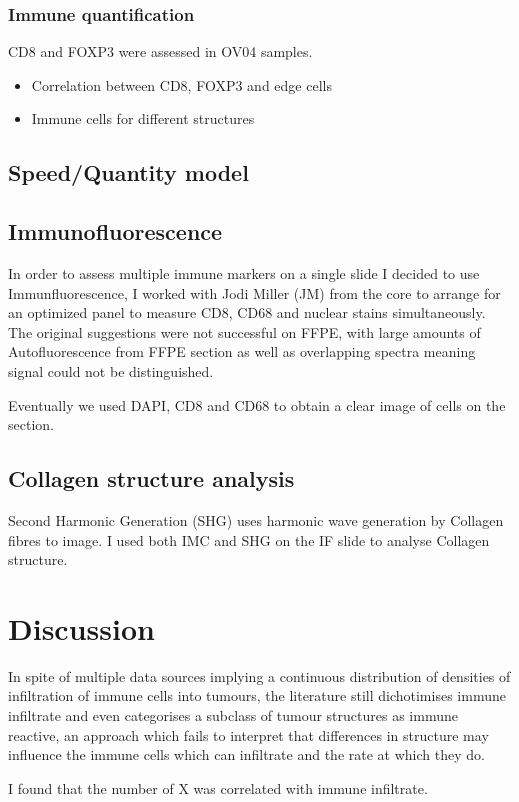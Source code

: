 \subsubsection{Immune quantification}

CD8 and FOXP3 were assessed in OV04 samples.
\begin{itemize}
    \item Correlation between CD8, FOXP3 and edge cells
    \item Immune cells for different structures
\end{itemize}

\subsection{Speed/Quantity model}

\subsection{Immunofluorescence}
In order to assess multiple immune markers on a single slide I decided to use Immunfluorescence, I worked with Jodi Miller (JM) from the core to arrange for an optimized panel to measure CD8, CD68 and nuclear stains simultaneously.
The original suggestions were not successful on FFPE, with large amounts of Autofluorescence from FFPE section as well as overlapping spectra meaning signal could not be distinguished.

Eventually we used DAPI, CD8 and CD68 to obtain a clear image of cells on the section. 

\subsection{Collagen structure analysis}
Second Harmonic Generation (SHG) uses harmonic wave generation by Collagen fibres to image. I used both IMC and SHG on the IF slide to analyse Collagen structure.

\section{Discussion}


In spite of multiple data sources implying a continuous distribution of densities of infiltration of immune cells into tumours, the literature still dichotimises immune infiltrate and even categorises a subclass of tumour structures as immune reactive, an approach which fails to interpret that differences in structure may influence the immune cells which can infiltrate and the rate at which they do.

I found that the number of X was correlated with immune infiltrate. 
